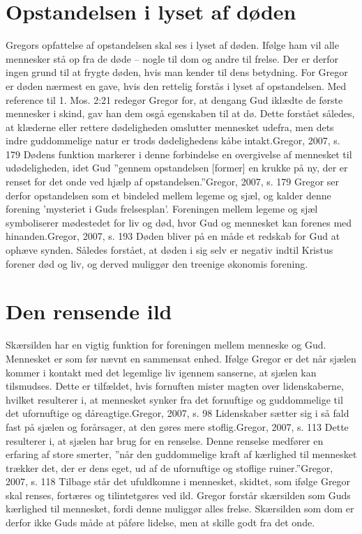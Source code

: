 \section{Opstandelsen i lyset af døden}
Gregors opfattelse af opstandelsen skal ses i lyset af døden. Ifølge ham vil alle mennesker stå op fra de døde -- nogle til dom og andre til frelse. Der er derfor ingen grund til at frygte døden, hvis man kender til dens betydning. For Gregor er døden nærmest en gave, hvis den rettelig forstås i lyset af opstandelsen. Med reference til 1. Mos. 2:21 redegør Gregor for, at dengang Gud iklædte de første mennesker i skind, gav han dem osgå egenskaben til at dø. Dette forstået således, at klæderne eller rettere dødeligheden omslutter mennesket udefra, men dets indre guddommelige natur er trods dødelighedens kåbe intakt.{Gregor, 2007, s. 179} Dødens funktion markerer i denne forbindelse en overgivelse af mennesket til udødeligheden, idet Gud ”gennem opstandelsen [former] en krukke på ny, der er renset for det onde ved hjælp af opstandelsen.”{Gregor, 2007, s. 179} Gregor ser derfor opstandelsen som et bindeled mellem legeme og sjæl, og kalder denne forening 'mysteriet i Guds frelsesplan'. Foreningen mellem legeme og sjæl symboliserer mødestedet for liv og død, hvor Gud og mennesket kan forenes med hinanden.{Gregor, 2007, s. 193} Døden bliver på en måde et redskab for Gud at ophæve synden. Således forstået, at døden i sig selv er negativ indtil Kristus forener død og liv, og derved muliggør den treenige økonomis forening.

\section{Den rensende ild}
Skærsilden har en vigtig funktion for foreningen mellem menneske og Gud. Mennesket er som før nævnt en sammensat enhed. Ifølge Gregor er det når sjælen kommer i kontakt med det legemlige liv igennem sanserne, at sjælen kan tilsmudses. Dette er tilfældet, hvis fornuften mister magten over lidenskaberne, hvilket resulterer i, at mennesket synker fra det fornuftige og guddommelige til det ufornuftige og dåreagtige.{Gregor, 2007, s. 98} Lidenskaber sætter sig i så fald fast på sjælen og forårsager, at den gøres mere stoflig.{Gregor, 2007, s. 113} Dette resulterer i, at sjælen har brug for en renselse. Denne renselse medfører en erfaring af store smerter, ”når den guddommelige kraft af kærlighed til mennesket trækker det, der er dens eget, ud af de ufornuftige og stoflige ruiner.”{Gregor, 2007, s. 118} Tilbage står det ufuldkomne i mennesket, skidtet, som ifølge Gregor skal renses, fortæres og tilintetgøres ved ild. Gregor forstår skærsilden som Guds kærlighed til mennesket, fordi denne muliggør alles frelse. Skærsilden som dom er derfor ikke Guds måde at påføre lidelse, men at skille godt fra det onde.

